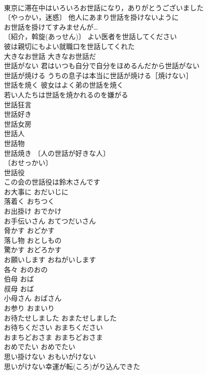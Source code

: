 \documentclass[8pt]{extreport}
\begin{document}
\begin{CJK}{UTF8}{min}
\\	東京に滞在中はいろいろお世話になり，ありがとうございました 
\\	〔やっかい，迷惑〕 他人にあまり世話を掛けないように 
\\	お世話を掛けてすみませんが… 
\\	〔紹介，斡旋(あっせん)〕 よい医者を世話してください 
\\	彼は親切にもよい就職口を世話してくれた 
\\	大きなお世話 大きなお世話だ 
\\	世話がない 君はいつも自分で自分をほめるんだから世話がない 
\\	世話が焼ける うちの息子は本当に世話が焼ける［焼けない］ 
\\	世話を焼く 彼女はよく弟の世話を焼く 
\\	若い人たちは世話を焼かれるのを嫌がる 
\\	世話狂言 
\\	世話好き 
\\	世話女房 
\\	世話人 
\\	世話物 
\\	世話焼き 〔人の世話が好きな人〕
\\	〔おせっかい〕
\\	世話役 
\\	この会の世話役は鈴木さんです 
\\	お大事に	おだいじに	
\\	落着く	おちつく	
\\	お出掛け	おでかけ	
\\	お手伝いさん	おてつだいさん	
\\	脅かす	おどかす	
\\	落し物	おとしもの	
\\	驚かす	おどろかす	
\\	お願いします	おねがいします	
\\	各々	おのおの	
\\	伯母	おば	
\\	叔母	おば	
\\	小母さん	おばさん	
\\	お参り	おまいり	
\\	お待たせしました	おまたせしました	
\\	お待ちください	おまちください	
\\	おまちどおさま	おまちどおさま	
\\	おめでたい	おめでたい	
\\	思い掛けない	おもいがけない	
\\	思いがけない幸運が転(ころ)がり込んできた 

\end{CJK}
\end{document}
